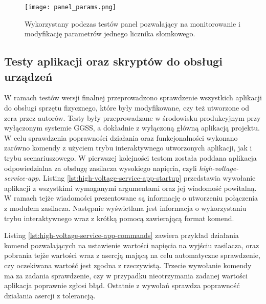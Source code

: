 \clearpage
\begin{figure}[H]
    \centering
    \texttt{[image: panel\_params.png]}
    \caption{Wykorzystany podczas testów panel pozwalający na monitorowanie i modyfikację parametrów jednego licznika słomkowego.}
    \label{fig:panel-params}
\end{figure}


\subsection{Testy aplikacji oraz skryptów do obsługi urządzeń}

W ramach testów wersji finalnej przeprowadzono sprawdzenie wszystkich aplikacji do obsługi sprzętu fizycznego, które były modyfikowane, czy też utworzone od zera przez autorów. Testy były przeprowadzane w środowisku produkcyjnym przy wyłączonym systemie GGSS, a dokładnie z wyłączoną główną aplikacją projektu. W celu sprawdzenia poprawności działania oraz funkcjonalności wykonano zarówno komendy z użyciem trybu interaktywnego utworzonych aplikacji, jak i trybu scenariuszowego. W pierwszej kolejności testom została poddana aplikacja odpowiedzialna za obsługę zasilacza wysokiego napięcia, czyli \emph{high-voltage-service-app}. Listing \ref{lst:high-voltage-service-app-startup} przedstawia wywołanie aplikacji z wszystkimi wymaganymi argumentami oraz jej wiadomość powitalną. W ramach tejże wiadomości prezentowane są informację o utworzeniu połączenia z modułem zasilacza. Następnie wyświetlana jest informacja o wykorzystaniu trybu interaktywnego wraz z krótką pomocą zawierającą format komend.

\clearpage


Listing \ref{lst:high-voltage-service-app-commands} zawiera przykład działania komend pozwalających na ustawienie wartości napięcia na wyjściu zasilacza, oraz pobrania tejże wartości wraz z asercją mającą na celu automatyczne sprawdzenie, czy oczekiwana wartość jest zgodna z rzeczywistą. Trzecie wywołanie komendy ma za zadania sprawdzenie, czy w przypadku nieotrzymania zadanej wartości aplikacja poprawnie zgłosi błąd. Ostatnie z wywołań sprawdza poprawność działania asercji z tolerancją.



